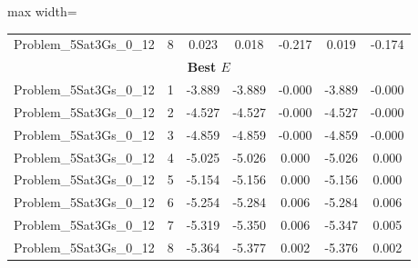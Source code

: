 \begin{table}[!htbp]
\begin{adjustbox}{max width=\columnwidth}
\begin{tabularx}{\columnwidth}{c|c c c c c c}
            Problem\_5Sat3Gs\_0\_12 & 8 & 0.023 & 0.018 & -0.217 & 0.019 & -0.174 \\
            \multicolumn{7}{c}{\textbf{Best $E$}} \\ \midrule
            Problem\_5Sat3Gs\_0\_12 & 1 & -3.889 & -3.889 & -0.000 & -3.889 & -0.000 \\
            Problem\_5Sat3Gs\_0\_12 & 2 & -4.527 & -4.527 & -0.000 & -4.527 & -0.000 \\
            Problem\_5Sat3Gs\_0\_12 & 3 & -4.859 & -4.859 & -0.000 & -4.859 & -0.000 \\
            Problem\_5Sat3Gs\_0\_12 & 4 & -5.025 & -5.026 & 0.000 & -5.026 & 0.000 \\
            Problem\_5Sat3Gs\_0\_12 & 5 & -5.154 & -5.156 & 0.000 & -5.156 & 0.000 \\
            Problem\_5Sat3Gs\_0\_12 & 6 & -5.254 & -5.284 & 0.006 & -5.284 & 0.006 \\
            Problem\_5Sat3Gs\_0\_12 & 7 & -5.319 & -5.350 & 0.006 & -5.347 & 0.005 \\
            Problem\_5Sat3Gs\_0\_12 & 8 & -5.364 & -5.377 & 0.002 & -5.376 & 0.002 \\
            \bottomrule
        \end{tabularx}
    \end{adjustbox}
\end{table}

